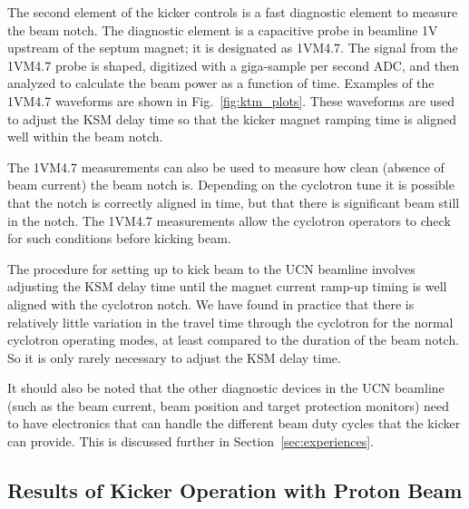 \documentclass[aps,prab,twocolumn,superscriptaddress]{revtex4-1}
\begin{document}
The second element of the kicker controls is a fast diagnostic element to measure the beam notch.  The diagnostic element is a capacitive probe in beamline 1V upstream of the septum magnet; it is designated as 1VM4.7.  The signal from the 1VM4.7 probe is shaped, digitized with a giga-sample per second ADC, and then analyzed to calculate the beam power as a function of time.  Examples of the 1VM4.7 waveforms are shown in Fig.~\ref{fig:ktm_plots}.  These waveforms are used to adjust the KSM delay time so that the kicker magnet ramping time is aligned well within the beam notch.

The 1VM4.7 measurements can also be used to measure how clean (absence of beam current) the beam notch is.  Depending on the cyclotron tune it is possible that the notch is correctly aligned in time, but that there is significant beam still in the notch.  The 1VM4.7 measurements allow the cyclotron operators to check for such conditions before kicking beam.

The procedure for setting up to kick beam to the UCN beamline involves adjusting the KSM delay time until the magnet current ramp-up timing is well aligned with the cyclotron notch.  We have found in practice that there is relatively little variation in the travel time through the cyclotron for the normal cyclotron operating modes, at least compared to the duration of the beam notch.  So it is only rarely necessary to adjust the KSM delay time.


It should also be noted that the other diagnostic devices in the UCN beamline (such as the beam current, beam position and target protection monitors) need to have electronics that can handle the different beam duty cycles that the kicker can provide.  This is discussed further in Section~\ref{sec:experiences}.

\subsection{Results of Kicker Operation with Proton Beam}
\label{sec:mistiming}
\end{document}
